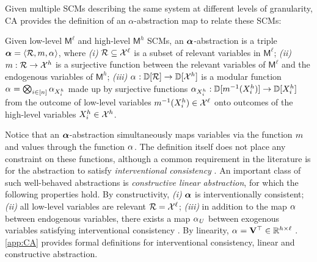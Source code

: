 Given multiple SCMs describing the same system at different levels of granularity, CA provides the definition of an $\alpha$-abstraction map to relate these SCMs:
\begin{definition}\label{def:abstraction}
Given low-level $\mathsf{M}^\ell$ and high-level $\mathsf{M}^h$ SCMs, an $\boldsymbol{\alpha}$-abstraction is a triple $\boldsymbol{\alpha} = \langle \mathcal{R}, m, \alpha_{} \rangle$, where \emph{(i)} $\mathcal{R} \subseteq \mathcal{X}^\ell$ is a subset of relevant variables in $\mathsf{M}^\ell$; \emph{(ii)} $m: \mathcal{R} \rightarrow \mathcal{X}^h$ is a surjective function between the relevant variables of $\mathsf{M}^\ell$ and the endogenous variables of $\mathsf{M}^h$; \emph{(iii)} $\alpha_{}: \mathbb{D}[\mathcal{R}] \rightarrow \mathbb{D}[\mathcal{X}^h]$ is a modular function $\alpha_{} = \bigotimes_{i\in[n]} \alpha_{X^h_i}$ made up by surjective functions $\alpha_{X^h_i}: \mathbb{D}[m^{-1}(X^h_i)] \rightarrow \mathbb{D}[X^h_i]$ from the outcome of low-level variables $m^{-1}(X^h_i) \in \mathcal{X}^\ell$ onto outcomes of the high-level variables $X^h_i \in \mathcal{X}^h$.
\end{definition}
Notice that an $\boldsymbol{\alpha}$-abstraction simultaneously maps variables via the function $m$ and values through the function $\alpha_{}$. The definition itself does not place any constraint on these functions, although a common requirement in the literature is for the abstraction to satisfy \emph{interventional consistency} \cite{rubenstein2017causal,rischel2020category,beckers2019abstracting}. An important class of such well-behaved abstractions is \emph{constructive linear abstraction}, for which the following properties hold. By constructivity, \emph{(i)} $\boldsymbol{\alpha}$ is interventionally consistent; \emph{(ii)} all low-level variables are relevant $\mathcal{R}=\mathcal{X}^\ell$; \emph{(iii)} in addition to the map $\alpha_{}$ between endogenous variables, there exists a map ${\alpha_{}}_U$ between exogenous variables satisfying interventional consistency \cite{beckers2019abstracting,schooltink2024aligning}. By linearity, $\alpha_{} = \mathbf{V}^\top \in \mathbb{R}^{h \times \ell}$ \cite{massidda2024learningcausalabstractionslinear}. \cref{app:CA} provides formal definitions for interventional consistency, linear and constructive abstraction.